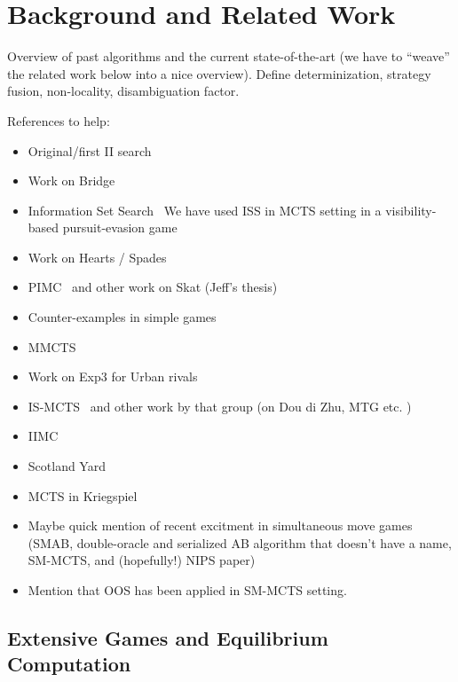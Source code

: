 \documentclass[letterpaper]{article}
\begin{document}
\section{Background and Related Work}

Overview of past algorithms and the current state-of-the-art (we have to ``weave'' the related work below into a nice overview).
Define determinization, strategy fusion, non-locality, disambiguation factor. 

References to help:
\begin{itemize}
\item Original/first II search~\cite{Frank98Finding}
\item Work on Bridge~\cite{Ginsberg01}
\item Information Set Search~\cite{Parker06paranoia} We have used ISS in MCTS setting in a visibility-based pursuit-evasion game~\cite{Lisy12peg}
\item Work on Hearts / Spades~\cite{Sturtevant08An}
\item PIMC~\cite{long2010understanding} and other work on Skat (Jeff's thesis)
\item Counter-examples in simple games~\cite{Shafiei09,Ponsen11Computing} 
\item MMCTS~\cite{Auger11Multiple}
\item Work on Exp3 for Urban rivals~\cite{Teytaud11Upper,StPierre12Online}
\item IS-MCTS~\cite{Cowling12ISMCTS} and other work by that group (on Dou di Zhu, MTG etc. \cite{Whitehouse11DDZ,Cowling12MTG})
\item IIMC~\cite{Furtak13Recursive}
\item Scotland Yard~\cite{Nijssen12SY}
\item MCTS in Kriegspiel~\cite{Ciancarini09Kriegspiel}
\item Maybe quick mention of recent excitment in simultaneous move games (SMAB, double-oracle and serialized AB algorithm that doesn't have a name, SM-MCTS, and (hopefully!) NIPS paper)
\item Mention that OOS has been applied in SM-MCTS setting.
\end{itemize}

\subsection{Extensive Games and Equilibrium Computation}
\end{document}
